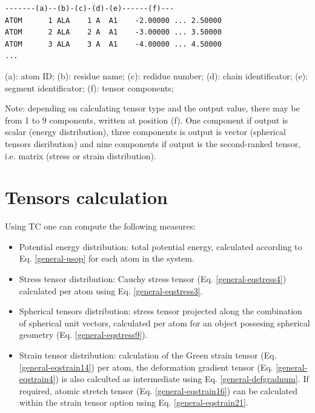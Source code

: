 \documentclass[letterpaper,10pt,english]{sphinxmanual}
\begin{document}
\begin{Verbatim}[commandchars=\\\{\}]
-------(a)--(b)-(c)-(d)-(e)------(f)---
ATOM      1 ALA    1 A  A1    -2.00000 ... 2.50000
ATOM      2 ALA    2 A  A1    -3.00000 ... 3.50000
ATOM      3 ALA    3 A  A1    -4.00000 ... 4.50000
...
\end{Verbatim}

(a): atom ID;
(b): residue name;
(c): redidue number;
(d): chain identificator;
(e): segment identificator;
(f): tensor components;

Note: depending on calculating tensor type and the output value, there may be from 1 to 9 components, written at position (f). One component if output is scalar (energy distribution), three components is output is vector (spherical tensors disribution) and nine components if output is the second-ranked tensor, i.e. matrix (stress or strain distribution).


\section{Tensors calculation}
\label{general:tensors-calculation}
Using TC one can compute the following measures:
\begin{itemize}
\item {} 
Potential energy distribution: total potential energy, calculated according to Eq. \eqref{general-usop} for each atom in the system.

\item {} 
Stress tensor distribution: Cauchy stress tensor (Eq. \eqref{general-eqstress4}) calculated per atom using Eq. \eqref{general-eqstress3}.

\item {} 
Spherical tensors distribution: stress tensor projected along the combination of spherical unit vectors, calculated per atom for an object possesing spherical geometry (Eq. \eqref{general-eqstress9}).

\item {} 
Strain tensor distribution: calculation of the Green strain tensor (Eq. \eqref{general-eqstrain14}) per atom, the deformation gradient tensor (Eq. \eqref{general-eqstrain4}) is also calculted as intermediate using Eq. \eqref{general-defgradnum}. If required, atomic stretch tensor (Eq. \eqref{general-eqstrain16}) can be calculated within the strain tensor option using Eq. \eqref{general-eqstrain21}.

\end{itemize}
\end{document}
